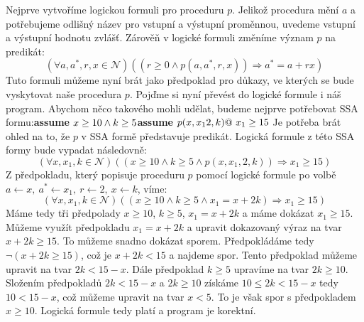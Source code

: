 \documentclass{article}
\begin{document}
Nejprve vytvoříme logickou formuli pro proceduru $p$. Jelikož procedura mění $a$ a potřebujeme odlišný název pro vstupní a výstupní proměnnou, uvedeme vstupní a výstupní hodnotu zvlášť. Zárověň v logické formuli změníme význam $p$ na predikát:  
$$(\forall a, a^*,r, x \in \mathcal{N})((r \geq 0 \wedge p(a,a^*,r,x)) \Rightarrow a^* = a + rx)$$
Tuto formuli můžeme nyní brát jako předpoklad pro důkazy, ve kterých se bude vyskytovat naše procedura $p$. Pojďme si nyní převést do logické formule i náš program. Abychom něco takového mohli udělat, budeme nejprve potřebovat SSA formu:\newline\newline \textbf{assume} $x \geq 10 \wedge k \geq 5 \newline $\textbf{assume} $p(x,x_1 2, k) \newline @\ x_1 \geq 15$ \newline\newline
Je potřeba brát ohled na to, že $p$ v SSA formě představuje predikát. Logická formule z této SSA formy bude vypadat následovně:
$$(\forall x,x_1,k \in \mathcal{N})((x \geq 10 \wedge k \geq 5 \wedge p(x,x_1,2,k)) \Rightarrow x_1 \geq 15)$$
Z předpokladu, který popisuje proceduru $p$ pomocí logické formule po volbě $a \leftarrow x,\ a^* \leftarrow x_1, \ r \leftarrow 2,\ x \leftarrow k$, víme:
$$(\forall x,x_1,k \in \mathcal{N})((x \geq 10 \wedge k \geq 5 \wedge x_1 = x + 2k) \Rightarrow x_1 \geq 15)$$
Máme tedy tři předpolady $x \geq 10$, $k \geq 5$, $x_1 = x + 2k$ a máme dokázat $x_1 \geq 15$. Můžeme využít předpokladu $x_1 = x + 2k$ a upravit dokazovaný výraz na tvar $x + 2k \geq 15$. To můžeme snadno dokázat sporem. Předpokládáme tedy $\neg (x + 2k \geq 15)$, což je $x + 2k < 15$ a najdeme spor. Tento předpoklad můžeme upravit na tvar $2k < 15 - x$. Dále předpoklad $k \geq 5$ upravíme na tvar $2k \geq 10$. Složením předpokladů $2k < 15 - x$ a $2k \geq 10$ získáme $10 \leq 2k < 15 - x$ tedy $ 10 < 15 - x$, což můžeme upravit na tvar $x < 5$. To je však spor s předpokladem $x \geq 10$. Logická formule tedy platí a program je korektní.
\end{document}
